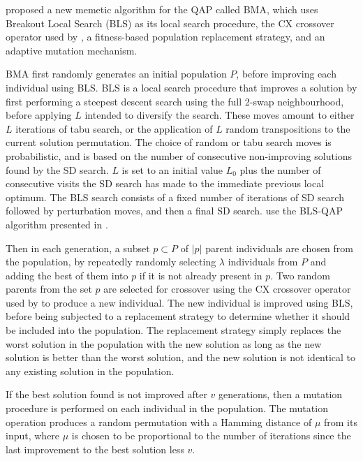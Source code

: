 {    %

	\citet{Benlic:2015gp} proposed a new memetic algorithm for the QAP called BMA, which uses Breakout Local Search (BLS) as its local search procedure, the CX crossover operator used by \citet{Merz:2000ek}, a fitness-based population replacement strategy, and an adaptive mutation mechanism.

	BMA first randomly generates an initial population \(P\), before improving each individual using BLS.
	BLS is a local search procedure that improves a solution by first performing a steepest descent search using the full 2-swap neighbourhood, before applying \(L\)  intended to diversify the search. These moves amount to either \(L\) iterations of tabu search, or the application of \(L\) random transpositions to the current solution permutation. The choice of random or tabu search moves is probabilistic, and is based on the number of consecutive non-improving solutions found by the SD search. \(L\) is set to an initial value \(L_0\) plus the number of consecutive visits the SD search has made to the immediate previous local optimum.
	The BLS search consists of a fixed number of iterations of SD search followed by perturbation moves, and then a final SD search.
	\citeauthor{Benlic:2015gp} use the BLS-QAP algorithm presented in \citet{Benlic:2013gi}.

	Then in each generation, a subset \(p \subset P\) of \(|p|\) parent individuals are chosen from the population, by repeatedly randomly selecting \(\lambda\) individuals from \(P\) and adding the best of them into \(p\) if it is not already present in \(p\).
	Two random parents from the set \(p\) are selected for crossover using the CX crossover operator used by \citet{Merz:2000ek} to produce a new individual. %
	The new individual is improved using BLS, before being subjected to a replacement strategy to determine whether it should be included into the population. The replacement strategy simply replaces the worst solution in the population with the new solution as long as the new solution is better than the worst solution, and the new solution is not identical to any existing solution in the population.

	If the best solution found is not improved after \(v\) generations, then a mutation procedure is performed on each individual in the population. The mutation operation produces a random permutation with a Hamming distance of \(\mu\) from its input, where \(\mu\) is chosen to be proportional to the number of iterations since the last improvement to the best solution less \(v\).

}
